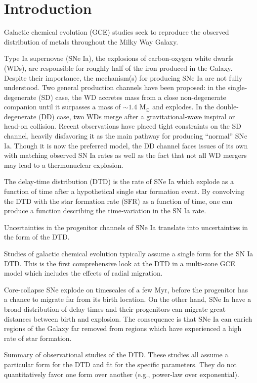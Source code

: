 \documentclass[modern,linenumbers]{aastex631}
\begin{document}
\section{Introduction}

Galactic chemical evolution (GCE) studies seek to reproduce the observed distribution of metals throughout the Milky Way Galaxy.

Type Ia supernovae (SNe Ia), the explosions of carbon-oxygen white dwarfs (WDs), are responsible for roughly half of the iron produced in the Galaxy. Despite their importance, the mechanism(s) for producing SNe Ia are not fully understood. Two general production channels have been proposed: in the single-degenerate (SD) case, the WD accretes mass from a close non-degenerate companion until it surpasses a mass of $\sim1.4$ M$_\odot$ and explodes. In the double-degenerate (DD) case, two WDs merge after a gravitational-wave inspiral or head-on collision. Recent observations have placed tight constraints on the SD channel, heavily disfavoring it as the main pathway for producing ``normal'' SNe Ia. Though it is now the preferred model, the DD channel faces issues of its own with matching observed SN Ia rates as well as the fact that not all WD mergers may lead to a thermonuclear explosion.

The delay-time distribution (DTD) is the rate of SNe Ia which explode as a function of time after a hypothetical single star formation event. By convolving the DTD with the star formation rate (SFR) as a function of time, one can produce a function describing the time-variation in the SN Ia rate.

Uncertainties in the progenitor channels of SNe Ia translate into uncertainties in the form of the DTD. 

Studies of galactic chemical evolution typically assume a single form for the SN Ia DTD. This is the first comprehensive look at the DTD in a multi-zone GCE model which includes the effects of radial migration.

Core-collapse SNe explode on timescales of a few Myr, before the progenitor has a chance to migrate far from its birth location. On the other hand, SNe Ia have a broad distribution of delay times and their progenitors can migrate great distances between birth and explosion. The consequence is that SNe Ia can enrich regions of the Galaxy far removed from regions which have experienced a high rate of star formation.

Summary of observational studies of the DTD. These studies all assume a particular form for the DTD and fit for the specific parameters. They do not quantitatively favor one form over another (e.g., power-law over exponential).
\end{document}
